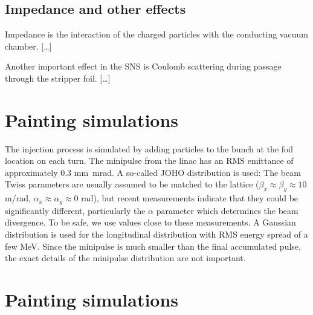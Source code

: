 \subsection{Impedance and other effects}

Impedance is the interaction of the charged particles with the conducting vacuum chamber. […]

Another important effect in the SNS is Coulomb scattering during passage through the stripper foil. […]



\section{Painting simulations}

The injection process is simulated by adding particles to the bunch at the foil location on each turn. The minipulse from the linac has an RMS emittance of approximately 0.3 mm~mrad. A so-called JOHO distribution is used:
%
%
The beam Twiss parameters are usually assumed to be matched to the lattice ($\beta_x \approx \beta_y \approx 10$ m/rad, $\alpha_x \approx \alpha_y \approx 0$ rad), but recent measurements indicate that they could be significantly different, particularly the $\alpha$ parameter which determines the beam divergence. To be safe, we use values close to these measurements. A Gaussian distribution is used for the longitudinal distribution with RMS energy spread of a few MeV. Since the minipulse is much smaller than the final accumulated pulse, the exact details of the minipulse distribution are not important.




\section{Painting simulations}